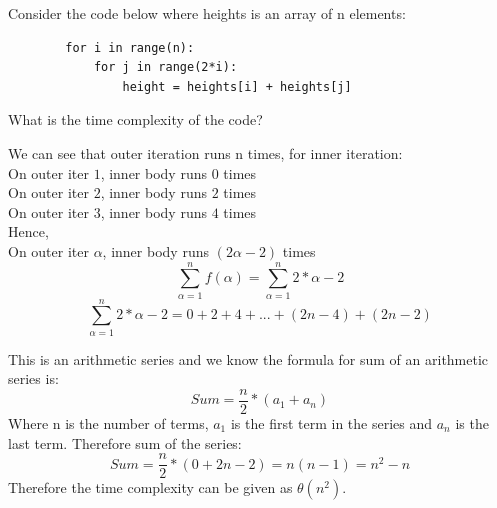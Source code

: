 \begin{prob}
	Consider the code below where heights is an array of n elements:
	\begin{verbatim}
		for i in range(n):
			for j in range(2*i):
				height = heights[i] + heights[j]
    	\end{verbatim}
	What is the time complexity of the code?
    \begin{soln}
    
    	We can see that outer iteration runs n times, for inner iteration: \\ 
	On outer iter $1$, inner body runs $0$ times \\
	On outer iter $2$, inner body runs $2$ times \\
	On outer iter $3$, inner body runs $4$ times \\
	Hence, \\
	On outer iter $\alpha$, inner body runs $(2\alpha - 2)$ times 
        \[ 
        \sum_{\alpha = 1}^{n} f(\alpha) = \sum_{\alpha = 1}^{n} 2*\alpha - 2 
        \]
        \[ 
        \sum_{\alpha = 1}^{n} 2*\alpha - 2  = 0 + 2 + 4 + ... + (2n - 4) + (2n - 2) 
        \]
        
        This is an arithmetic series and we know the formula for sum of an arithmetic series is:
    	\[
        		Sum = \frac{n}{2} * (a_1 + a_n)
    	\]
    	Where n is the number of terms, $a_1$ is the first term in the series and $a_n$ is the last term.
    	Therefore sum of the series:
    	\[
        		Sum = \frac{n}{2} * (0 + 2n-2) = n(n-1) = n^2 - n 
    	\]
    	Therefore the time complexity can be given as $\theta(n^2)$.   
    \end{soln}
\end{prob}
